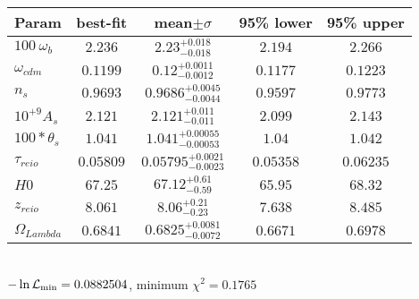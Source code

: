 \begin{tabular}{|l|c|c|c|c|} 
 \hline 
Param & best-fit & mean$\pm\sigma$ & 95\% lower & 95\% upper \\ \hline 
$100~\omega{}_{b }$ &$2.236$ & $2.23_{-0.018}^{+0.018}$ & $2.194$ & $2.266$ \\ 
$\omega{}_{cdm }$ &$0.1199$ & $0.12_{-0.0012}^{+0.0011}$ & $0.1177$ & $0.1223$ \\ 
$n_{s }$ &$0.9693$ & $0.9686_{-0.0044}^{+0.0045}$ & $0.9597$ & $0.9773$ \\ 
$10^{+9}A_{s }$ &$2.121$ & $2.121_{-0.011}^{+0.011}$ & $2.099$ & $2.143$ \\ 
$100*\theta{}_{s }$ &$1.041$ & $1.041_{-0.00053}^{+0.00055}$ & $1.04$ & $1.042$ \\ 
$\tau{}_{reio }$ &$0.05809$ & $0.05795_{-0.0023}^{+0.0021}$ & $0.05358$ & $0.06235$ \\ 
$H0$ &$67.25$ & $67.12_{-0.59}^{+0.61}$ & $65.95$ & $68.32$ \\ 
$z_{reio }$ &$8.061$ & $8.06_{-0.23}^{+0.21}$ & $7.638$ & $8.485$ \\ 
$\Omega{}_{Lambda }$ &$0.6841$ & $0.6825_{-0.0072}^{+0.0081}$ & $0.6671$ & $0.6978$ \\ 
\hline 
 \end{tabular} \\ 
$-\ln{\cal L}_\mathrm{min} =0.0882504$, minimum $\chi^2=0.1765$ \\ 
